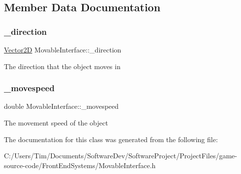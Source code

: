 \subsection{Member Data Documentation}
\mbox{\label{class_movable_interface_aea3e1edf8c32ebe5fd37dc02d659c10d}} 
\subsubsection{\texorpdfstring{\+\_\+direction}{\_direction}}
{\footnotesize\ttfamily \hyperlink{class_vector2_d}{Vector2D} Movable\+Interface\+::\+\_\+direction\hspace{0.3cm}{\ttfamily [protected]}}

The direction that the object moves in \mbox{\label{class_movable_interface_aa9715fd066607de7e71ee7f891ae1dbd}} 
\subsubsection{\texorpdfstring{\+\_\+movespeed}{\_movespeed}}
{\footnotesize\ttfamily double Movable\+Interface\+::\+\_\+movespeed\hspace{0.3cm}{\ttfamily [protected]}}

The movement speed of the object 

The documentation for this class was generated from the following file\+:\begin{DoxyCompactItemize}
\item 
C\+:/\+Users/\+Tim/\+Documents/\+Software\+Dev/\+Software\+Project/\+Project\+Files/game-\/source-\/code/\+Front\+End\+Systems/Movable\+Interface.\+h\end{DoxyCompactItemize}
